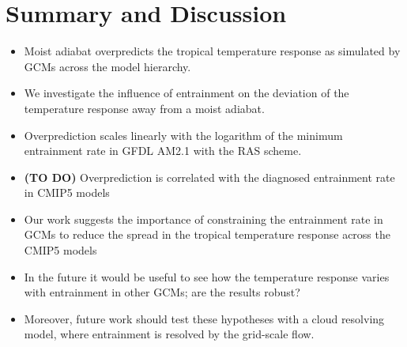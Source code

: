 \documentclass[draft]{agujournal2019}
\begin{document}
\section{Summary and Discussion}

\begin{itemize}
\item Moist adiabat overpredicts the tropical temperature response as simulated by GCMs across the model hierarchy.
\item We investigate the influence of entrainment on the deviation of the temperature response away from a moist adiabat.
\item Overprediction scales linearly with the logarithm of the minimum entrainment rate in GFDL AM2.1 with the RAS scheme.
\item \textbf{(TO DO)} Overprediction is correlated with the diagnosed entrainment rate in CMIP5 models
\item Our work suggests the importance of constraining the entrainment rate in GCMs to reduce the spread in the tropical temperature response across the CMIP5 models 
\item In the future it would be useful to see how the temperature response varies with entrainment in other GCMs; are the results robust?
\item Moreover, future work should test these hypotheses with a cloud resolving model, where entrainment is resolved by the grid-scale flow.
\end{itemize}




\end{document}
